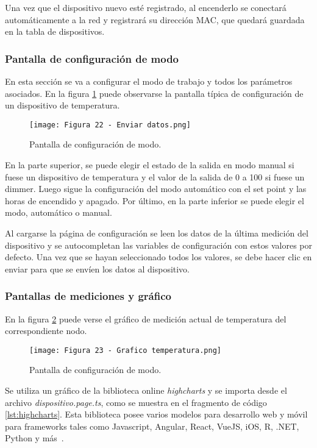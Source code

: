 Una vez que el dispositivo nuevo esté registrado, al encenderlo se conectará automáticamente a la red y registrará su dirección MAC, que quedará guardada en la tabla de dispositivos.

\subsubsection{Pantalla de configuración de modo}

En esta sección se va a configurar el modo de trabajo y todos los parámetros asociados. En la figura \ref{fig:22} puede observarse la pantalla típica de configuración de un dispositivo de temperatura.

\begin{figure}[h]
\centering
\texttt{[image: Figura 22 - Enviar datos.png]}
\caption[Pantalla de configuración de modo]{Pantalla de configuración de modo. \footnotemark}
\label{fig:22}
\end{figure}

En la parte superior, se puede elegir el estado de la salida en modo manual si fuese un dispositivo de temperatura y el valor de la salida de 0 a 100 si fuese un dimmer. Luego sigue la configuración del modo automático con el set point y las horas de encendido y apagado. Por último, en la parte inferior se puede elegir el modo, automático o manual.

Al cargarse la página de configuración se leen los datos de la última medición del dispositivo y se autocompletan las variables de configuración con estos valores por defecto. Una vez que se hayan seleccionado todos los valores, se debe hacer clic en enviar para que se envíen los datos al dispositivo.

\subsubsection{Pantallas de mediciones y gráfico}

En la figura \ref{fig:23} puede verse el gráfico de medición actual de temperatura del correspondiente nodo.

\begin{figure}[h]
\centering
\texttt{[image: Figura 23 - Grafico temperatura.png]}
\caption[Pantalla de configuración de modo]{Pantalla de configuración de modo. \footnotemark}
\label{fig:23}
\end{figure}

Se utiliza un gráfico de la biblioteca online \textit{highcharts} y se importa desde el archivo \textit{dispositivo.page.ts}, como se muestra en el fragmento de código \ref{lst:highcharts}. Esta biblioteca posee varios modelos para desarrollo web y móvil para frameworks tales como Javascript, Angular, React, VueJS, iOS, R, .NET, Python y más\ \citep{26}.

